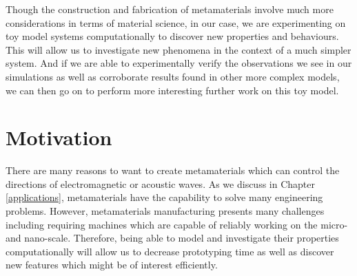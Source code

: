 Though the construction and fabrication of metamaterials involve much more
considerations in terms of material science, in our case, we are experimenting
on toy model systems computationally to discover new properties and behaviours.
This will allow us to investigate new phenomena in the context of a much
simpler system. And if we are able to experimentally verify the observations we
see in our simulations as well as corroborate results found in other more
complex models, we can then go on to perform more interesting further work on
this toy model.

\section{Motivation}
There are many reasons to want to create metamaterials which can control the
directions of electromagnetic or acoustic waves. As we discuss in Chapter
\ref{applications}, metamaterials have the capability to solve many engineering
problems. However, metamaterials manufacturing presents many challenges
including requiring machines which are capable of reliably working on the
micro- and nano-scale.\cite{metamanu} Therefore, being able to model and
investigate their properties computationally will allow us to decrease
prototyping time as well as discover new features which might be of interest
efficiently.
